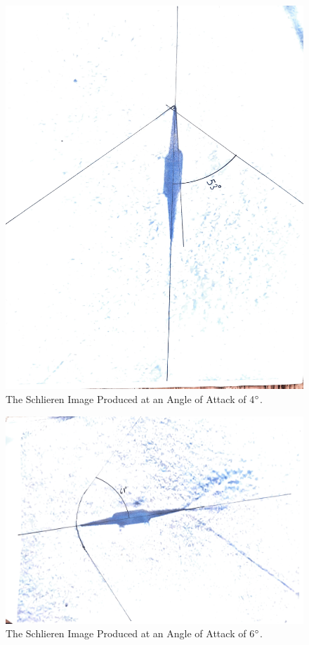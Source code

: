 \documentclass[stu, a4paper, 12pt, floatsintext]{apa7}
\numberwithin{figure}{section}
\numberwithin{table}{section}
\numberwithin{equation}{section}
\begin{document}
\begin{figure}[H]
    \caption{The Schlieren Image Produced at an Angle of Attack of 4$\degree$.}
    \label{fig:aero_four}
    \centering
    \includegraphics[width=1.0\textwidth]{pictures/four.png}
\end{figure}
\begin{figure}[H]
    \caption{The Schlieren Image Produced at an Angle of Attack of 6$\degree$.}
    \label{fig:aero_six}
    \centering
    \includegraphics[width=1.0\textwidth]{pictures/six.png}
\end{figure}
\end{document}
